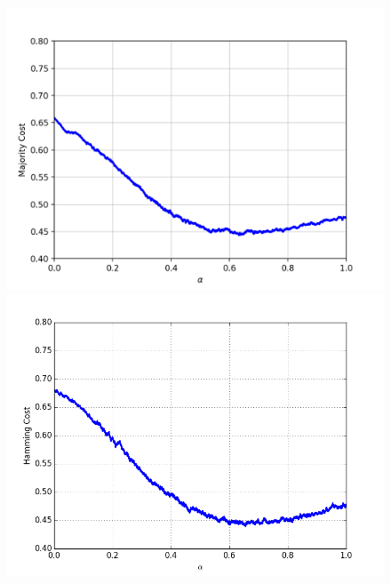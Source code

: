 \begin{figure}[h]
\centering
\begin{minipage}{.45\textwidth}
  \centering
  \includegraphics[width=\linewidth]{plots/mnist-ac-averaged}
\end{minipage}
\begin{minipage}{.45\textwidth}
  \centering
  \includegraphics[width=\linewidth]{plots/mnist-ac-random}
\end{minipage}
\begin{minipage}{.45\textwidth}
  \centering

\end{minipage}
\end{figure}
